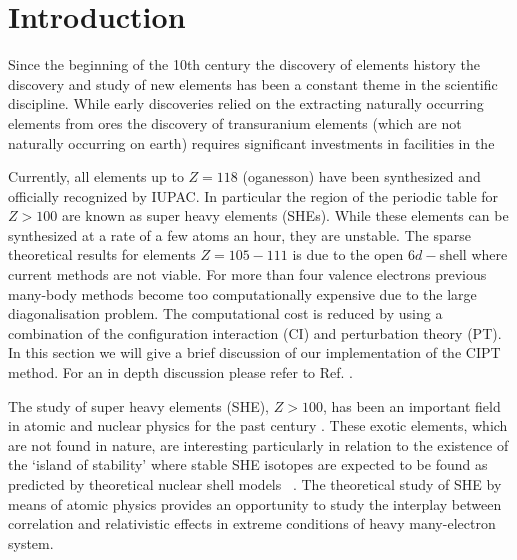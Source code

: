 \documentclass[8pt,a4paper, twoside]{report}
\begin{document}
\chapter{Introduction}
Since the beginning of the 10th century the discovery of elements history the discovery and study of new elements has been a constant theme  in the scientific discipline. While early discoveries relied on the extracting naturally occurring elements from ores the discovery of transuranium elements (which are not naturally occurring on earth) requires significant investments in facilities in the



Currently, all elements up to $Z=118$ (oganesson) have been synthesized and officially recognized by IUPAC. In particular the region of the periodic table for $Z>100$ are known as super heavy elements (SHEs). While these elements can be synthesized at a rate of a few atoms an hour, they are unstable. 
The sparse theoretical results for elements $Z=105-111$ is due to the open $6d-$shell where current methods are not viable. For more than four valence electrons previous many-body methods become too computationally expensive due to the large diagonalisation problem. The computational cost is reduced by using a combination of the configuration interaction (CI) and perturbation theory (PT). In this section we will give a brief discussion of our implementation of the CIPT method. For an in depth discussion please refer to Ref. \cite{DBHF2017}. 

The study of super heavy elements (SHE), $Z > 100$, has been an important field in atomic and nuclear physics for the 
past century \cite{Oganessian2009,  HHO2013}.  These exotic elements, which are not found in nature, are interesting
particularly in relation to the existence of the `island of stability' where stable SHE isotopes are expected to be found 
as predicted by theoretical nuclear shell models ~\cite{OUL2004, HHO2013, Leino2016, Oganessian2012}. 
The theoretical study of SHE by means of atomic physics provides an opportunity to study the interplay between correlation and
relativistic effects in extreme conditions of heavy many-electron system.

\end{document}
